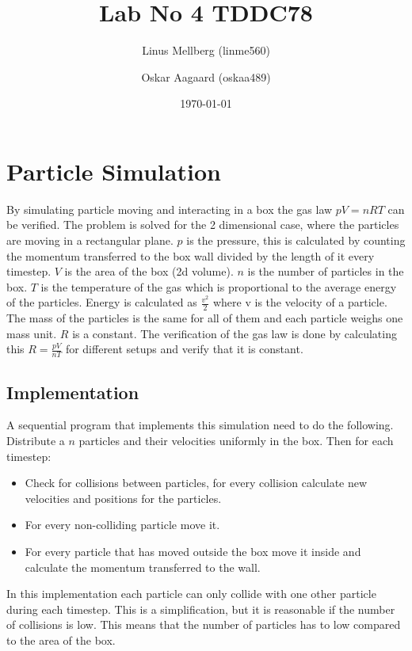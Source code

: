 \documentclass[a4paper,11pt]{article}
\begin{document}
\title{Lab No 4 TDDC78}
\author{Linus Mellberg (linme560) \and Oskar Aagaard (oskaa489)}
\date{\today}
\maketitle
\pagebreak
\thispagestyle{tcr}
\pagestyle{tcr}

\section{Particle Simulation}
By simulating particle moving and interacting in a box the gas law $pV = nRT$ can be verified.
The problem is solved for the 2 dimensional case, where the particles are moving in a rectangular plane.
$p$ is the pressure, this is calculated by counting the momentum transferred to the box wall divided by the length of it every timestep.
$V$ is the area of the box (2d volume).
$n$ is the number of particles in the box.
$T$ is the temperature of the gas which is proportional to the average energy of the particles.
Energy is calculated as $\frac{v^2}{2}$ where v is the velocity of a particle.
The mass of the particles is the same for all of them and each particle weighs one mass unit.
$R$ is a constant.
The verification of the gas law is done by calculating this $R=\frac{pV}{nT}$ for different setups and verify that it is constant.

\subsection{Implementation}
A sequential program that implements this simulation need to do the following.
Distribute a $n$ particles and their velocities uniformly in the box.
Then for each timestep:
\begin{itemize}
  \item Check for collisions between particles, for every collision calculate new velocities and positions for the particles.
  \item For every non-colliding particle move it.
  \item For every particle that has moved outside the box move it inside and calculate the momentum transferred to the wall.
\end{itemize}
In this implementation each particle can only collide with one other particle during each timestep.
This is a simplification, but it is reasonable if the number of collisions is low.
This means that the number of particles has to low compared to the area of the box.
\end{document}

